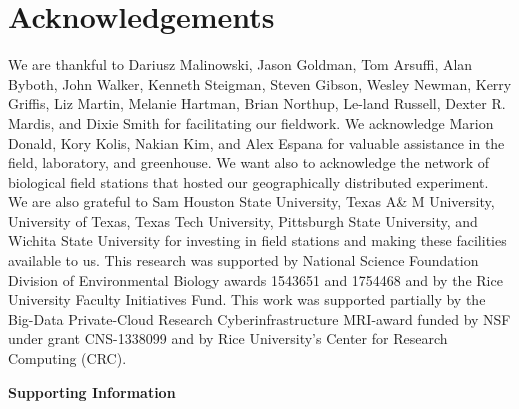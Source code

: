 \documentclass[12pt]{article}
\begin{document}
\section*{Acknowledgements}
We are thankful to Dariusz Malinowski, Jason Goldman, Tom Arsuffi, Alan Byboth, John Walker, Kenneth Steigman, Steven Gibson, Wesley Newman, Kerry Griffis, Liz Martin, Melanie Hartman, Brian Northup, Le-land Russell, Dexter R. Mardis, and Dixie Smith for facilitating our fieldwork. 
We acknowledge Marion Donald, Kory Kolis, Nakian Kim, and Alex Espana for valuable assistance in the field, laboratory, and greenhouse. 
We want also to acknowledge the network of biological field stations that hosted our geographically distributed experiment. 
We are also grateful to Sam Houston State University, Texas A\& M University, University of Texas, Texas Tech University, Pittsburgh State University, and Wichita State University for investing in field stations and making these facilities available to us. 
This research was supported by National Science Foundation Division of Environmental Biology awards 1543651 and 1754468 and by the Rice University Faculty Initiatives Fund.
This work was supported partially by the Big-Data Private-Cloud Research Cyberinfrastructure MRI-award funded by NSF under grant CNS-1338099 and by Rice University's Center for Research Computing (CRC).


\newpage


\newpage
\clearpage 
\setcounter{equation}{0}
\setcounter{figure}{0}
\setcounter{section}{0}
\setcounter{table}{0}
\renewcommand{\theequation}{S.\arabic{equation}}
\renewcommand{\thetable}{S-\arabic{table}}
\renewcommand{\thefigure}{S-\arabic{figure}}
\renewcommand{\thesection}{S.\arabic{section}}

\centerline{\Large{\textbf{Supporting Information}}}

\end{document}
